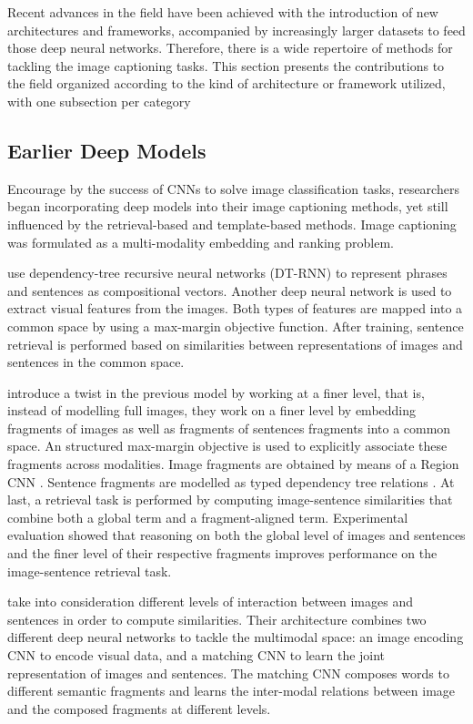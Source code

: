 Recent advances in the field have been achieved with the introduction of new architectures and frameworks, accompanied by increasingly larger datasets to feed those deep neural networks. Therefore, there is a wide repertoire of methods for tackling the image captioning tasks. This section presents the contributions to the field organized according to the kind of architecture or framework utilized, with one subsection per category

\subsection{Earlier Deep Models}\label{sec:earlier_deep-models}

Encourage by the success of CNNs to solve image classification tasks, researchers began incorporating deep models into their image captioning methods, yet still influenced by the retrieval-based and template-based methods. Image captioning was formulated as a multi-modality embedding \citet{Frome2013} and ranking problem.

\citet{Socher2014} use dependency-tree recursive neural networks (DT-RNN) to represent phrases and sentences as compositional vectors. Another deep neural network \citep{Le2013} is used to extract visual features from the images. Both types of  features are mapped into a common space by using a max-margin objective function. After training, sentence retrieval is performed based on similarities between representations of images and sentences in the common space.

\citet{Karpathy2014} introduce a twist in the previous model by working at a finer level, that is, instead of modelling full images, they work on a finer level by embedding fragments of images as well as fragments of sentences fragments into a common space.  An structured max-margin objective is used to explicitly associate these fragments across modalities. Image fragments are obtained by means of a Region CNN \citep{Girshick2014}. Sentence fragments are modelled as typed dependency tree relations \citep{DeMarneffe2006}. At last, a retrieval task is performed by computing image-sentence similarities that combine both a global term and a fragment-aligned term. Experimental evaluation showed that reasoning on both the global level of images and sentences and the finer level of their respective fragments improves performance on the image-sentence retrieval task.

\citet{Ma2015} take into consideration different levels of interaction between images and sentences in order to compute similarities. Their architecture combines two different deep neural networks to tackle the multimodal space: an image encoding CNN \citep{Simonyan2015} to encode visual data, and a matching CNN \citep{Hu2014} to learn the joint representation of images and sentences. The matching CNN composes words to different semantic fragments and learns the inter-modal relations between image and the composed fragments at different levels. 

